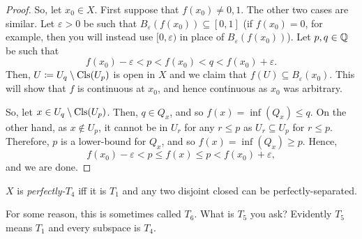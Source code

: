 \begin{thm}
\begin{proof}
So, let $x_0\in X$.  First suppose that $f(x_0)\neq 0,1$.  The other two cases are similar.  Let $\varepsilon >0$ be such that $B_\varepsilon (f(x_0))\subseteq [0,1]$ (if $f(x_0)=0$, for example, then you will instead use $[0,\varepsilon )$ in place of $B_\varepsilon (f(x_0))$).  Let $p,q\in \mathbb{Q}$ be such that
\begin{equation}
f(x_0)-\varepsilon <p<f(x_0)<q<f(x_0)+\varepsilon .
\end{equation}
Then, $U\coloneqq U_q\setminus \operatorname{Cls} (U_p)$ is open in $X$ and we claim that $f(U)\subseteq B_\varepsilon (x_0)$.  This will show that $f$ is continuous at $x_0$, and hence continuous as $x_0$ was arbitrary.

So, let $x\in U_q\setminus \operatorname{Cls} (U_p)$.  Then, $q\in Q_x$, and so $f(x)=\inf (Q_x)\leq q$.  On the other hand, as $x\notin U_p$, it cannot be in $U_r$ for any $r\leq p$ as $U_r\subseteq U_p$ for $r\leq p$.  Therefore, $p$ is a lower-bound for $Q_x$, and so $f(x)=\inf (Q_x)\geq p$.  Hence,
\begin{equation}
f(x_0)-\varepsilon <p\leq f(x)\leq p<f(x_0)+\varepsilon ,
\end{equation}
and we are done.
\end{proof}
\end{thm}
\begin{dfn}[Perfectly-$T_4$]\label{PerfectlyT4}
$X$ is \emph{perfectly-$T_4$} iff it is $T_1$ and any two disjoint closed can be perfectly-separated.
\begin{rmk}
For some reason, this is sometimes called $T_6$.  What is $T_5$ you ask?  Evidently $T_5$ means $T_1$ and every subspace is $T_4$.
\end{rmk}
\end{dfn}
